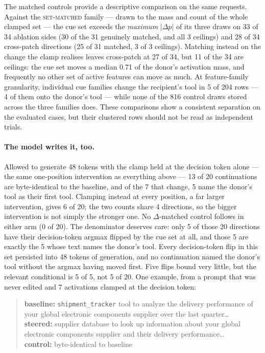 \documentclass{article}
\begin{document}
The matched controls provide a descriptive comparison on the same requests. Against the \textsc{set-matched} family --- drawn to the mass and count of the whole clamped set --- the cue set exceeds the \emph{maximum} $|\Delta p|$ of its three draws on 33 of 34 ablation sides (30 of the 31 genuinely matched, and all 3 ceilings) and 28 of 34 cross-patch directions (25 of 31 matched, 3 of 3 ceilings). Matching instead on the change the clamp realises leaves cross-patch at 27 of 34, but 11 of the 34 are ceilings: the cue set moves a median 0.71 of the donor's activation mass, and frequently no other set of active features can move as much. At feature-family granularity, individual cue families change the recipient's tool in 5 of 204 rows --- 4 of them onto the donor's tool --- while none of the 816 control draws stored across the three families does. These comparisons show a consistent separation on the evaluated cases, but their clustered rows should not be read as independent trials.

\paragraph{The model writes it, too.} Allowed to generate 48 tokens with the clamp held at the decision token alone --- the same one-position intervention as everything above --- 13 of 20 continuations are byte-identical to the baseline, and of the 7 that change, 5 name the donor's tool as their first tool. Clamping instead at every position, a far larger intervention, gives 6 of 20; the two counts share 4 directions, so the bigger intervention is not simply the stronger one. No $\Delta$-matched control follows in either arm (0 of 20). The denominator deserves care: only 5 of those 20 directions have their decision-token argmax flipped by the cue set at all, and those 5 are exactly the 5 whose text names the donor's tool. Every decision-token flip in this set persisted into 48 tokens of generation, and no continuation named the donor's tool without the argmax having moved first. Five flips bound very little, but the relevant conditional is 5 of 5, not 5 of 20. One example, from a prompt that was never edited and 7 activations clamped at the decision token:

\begin{quote}\small
\textbf{baseline:} \texttt{shipment\_tracker} tool to analyze the delivery performance of your global electronic components supplier over the last quarter\dots\\
\textbf{steered:} supplier database to look up information about your global electronic components supplier and their delivery performance\dots\\
\textbf{control:} byte-identical to baseline
\end{quote}
\end{document}
